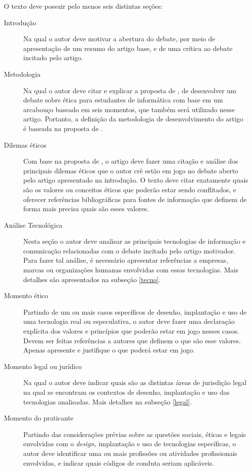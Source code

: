 \documentclass[12pt]{article}
\begin{document}
	O texto deve possuir pelo menos seis distintas seções:
	\begin{description}
		\item [Introdução] Na qual o autor deve motivar a abertura do debate, por meio de apresentação de um resumo do artigo base, e de uma crítica ao debate incitado pelo artigo. 
		\item [Metodologia] Na qual o autor deve citar e explicar a proposta de \citet{jones_doing_2016}, de desenvolver um debate sobre ética para estudantes de informática com base em um arcabouço baseado em seis momentos, que também será utilizado nesse artigo. Portanto, a definição da metodologia de desenvolvimento do artigo é baseada na proposta de \citet{jones_doing_2016}.
		\item [Dilemas éticos] Com base na proposta de \citet{jones_doing_2016}, o artigo deve fazer uma citação e análise dos principais dilemas éticos que o autor crê estão em jogo no debate aberto pelo artigo apresentado na introdução. O texto deve citar exatamente quais são os valores ou conceitos éticos que poderão estar sendo conflitados, e oferecer referências bibliográficas para fontes de informação que definem de forma mais precisa quais são esses valores.
		\item [Análise Tecnológica] Nesta seção o autor deve analisar as principais tecnologias de informação e comunicação relacionadas com o debate incitado pelo artigo motivador. Para fazer tal análise, é necessário apresentar referências a empresas, marcas ou organizações humanas envolvidas com essas tecnologias. Mais detalhes são apresentados na subseção \ref{tecno}.
		\item [Momento ético] Partindo de um ou mais casos específicos de desenho, implantação e uso de uma tecnologia real ou especulativa, o autor deve fazer uma declaração explícita dos valores e princípios que poderão estar em jogo nesses casos. Devem ser feitas referências a autores que definem o que são esse valores. Apenas apresente e justifique o que poderá estar em jogo.
		\item [Momento legal ou jurídico] Na qual o autor deve indicar quais são as distintas áreas de jurisdição legal na qual se encontram os contextos de desenho, implantação e uso das tecnologias analisadas.
		Mais detalhes na subseção \ref{legal}.
		\item [Momento do praticante] 
		Partindo das considerações prévias sobre as questões sociais, éticas e legais envolvidas com o \textit{design}, implantação e uso de tecnologias específicas, o autor deve identificar uma ou mais profissões ou atividades profissionais envolvidas, e indicar quais códigos de conduta seriam aplicáveis.
		

\end{description}
\end{document}

